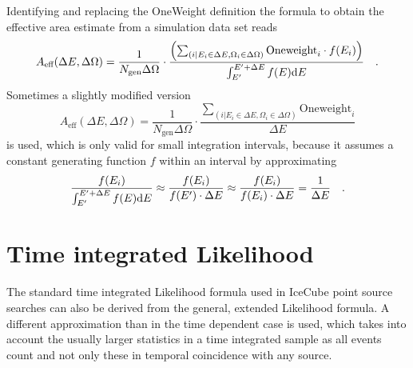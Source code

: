 Identifying and replacing the OneWeight definition the formula to obtain the effective area estimate from a simulation data set reads
\begin{equation}
  A_\text{eff}(\Delta E, \Delta \Omega) =
    \frac{1}{N_\text{gen}\Delta\Omega}\cdot
    \frac{\left(
            \sum_{(i|E_i\in\Delta E, \Omega_i\in\Delta\Omega)}
            \text{Oneweight}_i \cdot f(E_i)
          \right)}
          {\int_{E'}^{E'+\Delta E}f(E)\mathrm{d}E}
  \quad\text{.}
\end{equation}
Sometimes a slightly modified version
\begin{equation}
  A_\text{eff}(\Delta E, \Delta \Omega) =
    \frac{1}{N_\text{gen}\Delta\Omega}\cdot
    \frac{\sum_{(i|E_i\in\Delta E, \Omega_i\in\Delta\Omega)}
          \text{Oneweight}_i}
         {\Delta E}
\end{equation}
is used, which is only valid for small integration intervals, because it assumes a constant generating function $f$ within an interval by approximating
\begin{equation}
  \frac{f(E_i)}{\int_{E'}^{E'+\Delta E}f(E)\mathrm{d}E}
  \approx \frac{f(E_i)}{f(E')\cdot\Delta E}
  \approx \frac{f(E_i)}{f(E_i)\cdot\Delta E}
  = \frac{1}{\Delta E}
  \quad\text{.}
\end{equation}


\section{Time integrated Likelihood}
The standard time integrated Likelihood formula used in IceCube point source searches can also be derived from the general, extended Likelihood formula.
A different approximation than in the time dependent case is used, which takes into account the usually larger statistics in a time integrated sample as all events count and not only these in temporal coincidence with any source.

